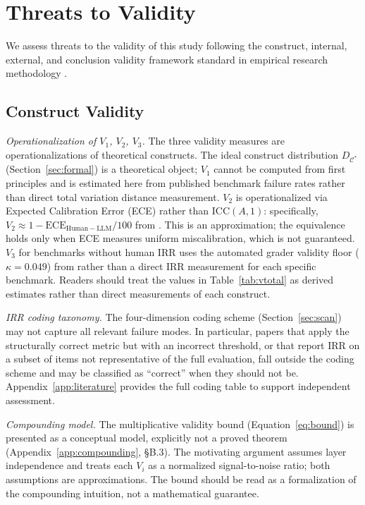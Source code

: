 \documentclass[preprint,12pt]{elsarticle}
\begin{document}
\section{Threats to Validity}
\label{sec:threats}

We assess threats to the validity of this study following the construct, internal,
external, and conclusion validity framework standard in empirical research methodology
\citep{wohlin2012,jedlitschka2008}.

\subsection{Construct Validity}
\label{sec:construct-threats}

\textit{Operationalization of $V_1$, $V_2$, $V_3$.} The three validity measures are
operationalizations of theoretical constructs. The ideal construct distribution
$D_{\mathcal{C}^*}$ (Section~\ref{sec:formal}) is a theoretical object; $V_1$
cannot be computed from first principles and is estimated here from published
benchmark failure rates \citep{zhu2025} rather than direct total variation distance
measurement. $V_2$ is operationalized via Expected Calibration Error (ECE) rather
than ICC$(A,1)$: specifically, $V_2 \approx 1 - \mathrm{ECE}_{\mathrm{Human-LLM}}/100$
from \citet{seshadri2026}. This is an approximation; the equivalence holds only when
ECE measures uniform miscalibration, which is not guaranteed. $V_3$ for benchmarks
without human IRR uses the automated grader validity floor ($\kappa = 0.049$) from
\citet{gurram2026} rather than a direct IRR measurement for each specific benchmark.
Readers should treat the values in Table~\ref{tab:vtotal} as derived estimates
rather than direct measurements of each construct.

\textit{IRR coding taxonomy.} The four-dimension coding scheme
(Section~\ref{sec:scan}) may not capture all relevant failure modes. In particular,
papers that apply the structurally correct metric but with an incorrect threshold, or
that report IRR on a subset of items not representative of the full evaluation, fall
outside the coding scheme and may be classified as ``correct'' when they should not
be. Appendix~\ref{app:literature} provides the full coding table to support
independent assessment.

\textit{Compounding model.}
The multiplicative validity bound (Equation~\ref{eq:bound}) is presented as a
conceptual model, explicitly not a proved theorem (Appendix~\ref{app:compounding},
\S{}B.3). The motivating argument assumes layer independence and treats each $V_i$
as a normalized signal-to-noise ratio; both assumptions are approximations. The bound
should be read as a formalization of the compounding intuition, not a mathematical
guarantee.
\end{document}
